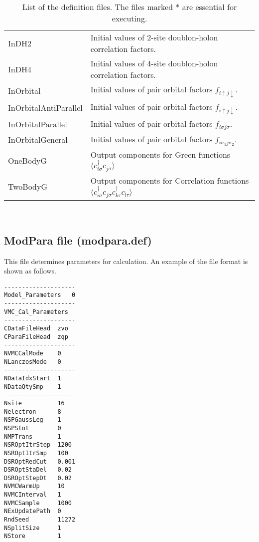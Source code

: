 \begin{table*}[h!]
\begin{center}
\begin{tabular}{|ll|}
           InDH2 & Initial values of 2-site doublon-holon correlation factors.\\
           InDH4 & Initial values of 4-site doublon-holon correlation factors.\\
           InOrbital & Initial values of pair orbital factors $f_{i\uparrow j\downarrow}$.\\
           InOrbitalAntiParallel & Initial values of pair orbital factors $f_{i\uparrow j\downarrow}$.\\ 
           InOrbitalParallel & Initial values of pair orbital factors $f_{i\sigma j\sigma}$.\\ 
           InOrbitalGeneral & Initial values of pair orbital factors $f_{i\sigma_1 j\sigma_2}$.\\ 
           \hline
           OneBodyG         &   Output components for Green functions $\langle c_{i\sigma}^{\dagger}c_{j\sigma}\rangle$           \\   
           TwoBodyG &   Output components for Correlation functions $\langle c_{i\sigma}^{\dagger}c_{j\sigma}c_{k\tau}^{\dagger}c_{l\tau}\rangle$  \\   \hline
  \end{tabular}
\end{center}
\caption{List of the definition files. The files marked * are essential for executing.}
\label{Table:Defs}
\end{table*}%
\newpage
~
\newpage
\subsection{ModPara file (modpara.def)}
\label{Subsec:modpara}
This file determines parameters for calculation. An example of the file format is shown as follows.\\
\begin{minipage}{10cm}
\begin{screen}
\begin{verbatim}
--------------------
Model_Parameters   0
--------------------
VMC_Cal_Parameters
--------------------
CDataFileHead  zvo
CParaFileHead  zqp
--------------------
NVMCCalMode    0
NLanczosMode   0
--------------------
NDataIdxStart  1
NDataQtySmp    1
--------------------
Nsite          16
Nelectron      8
NSPGaussLeg    1
NSPStot        0
NMPTrans       1
NSROptItrStep  1200
NSROptItrSmp   100
DSROptRedCut   0.001
DSROptStaDel   0.02
DSROptStepDt   0.02
NVMCWarmUp     10
NVMCInterval   1
NVMCSample     1000
NExUpdatePath  0
RndSeed        11272
NSplitSize     1
NStore         1  
\end{verbatim}
\end{screen}
\end{minipage}

